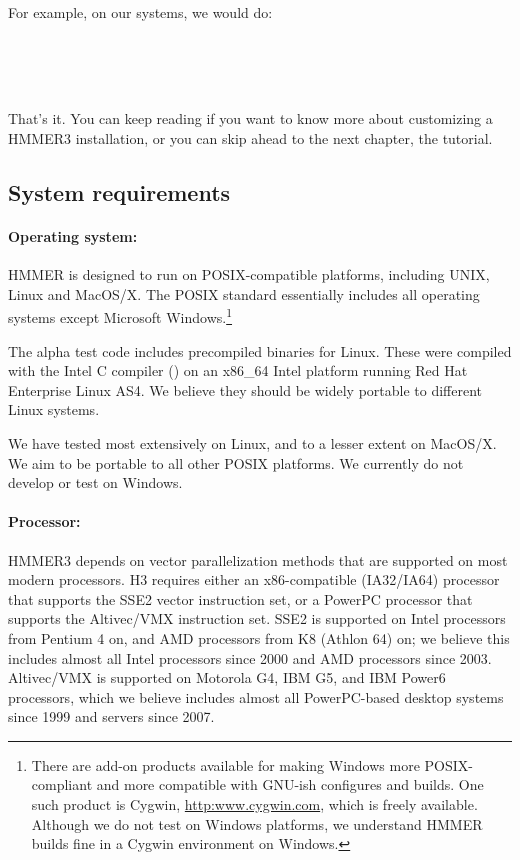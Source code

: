 For example, on our systems, we would do:

\\
\\
\\

That's it.  You can keep reading if you want to know more about
customizing a HMMER3 installation, or you can skip ahead to the next
chapter, the tutorial.


\subsection{System requirements}

\paragraph{Operating system:} HMMER is designed to run on
POSIX-compatible platforms, including UNIX, Linux and MacOS/X.  The
POSIX standard essentially includes all operating systems except
Microsoft Windows.\footnote{There are add-on products available for making Windows more
  POSIX-compliant and more compatible with GNU-ish configures and
  builds. One such product is Cygwin, \url{http:www.cygwin.com}, which
  is freely available. Although we do not test on Windows platforms,
  we understand HMMER builds fine in a Cygwin environment on Windows.}

The alpha test code includes precompiled binaries for Linux. These
were compiled with the Intel C compiler () on an x86\_64
Intel platform running Red Hat Enterprise Linux AS4. We believe they
should be widely portable to different Linux systems. 

We have tested most extensively on Linux, and to a lesser extent on
MacOS/X. We aim to be portable to all other POSIX platforms. We
currently do not develop or test on Windows.


\paragraph{Processor:} HMMER3 depends on vector parallelization methods
that are supported on most modern processors. H3 requires either an
x86-compatible (IA32/IA64) processor that supports the SSE2 vector
instruction set, or a PowerPC processor that supports the Altivec/VMX
instruction set. SSE2 is supported on Intel processors from Pentium 4
on, and AMD processors from K8 (Athlon 64) on; we believe this
includes almost all Intel processors since 2000 and AMD processors
since 2003. Altivec/VMX is supported on Motorola G4, IBM G5, and IBM
Power6 processors, which we believe includes almost all PowerPC-based
desktop systems since 1999 and servers since 2007.

